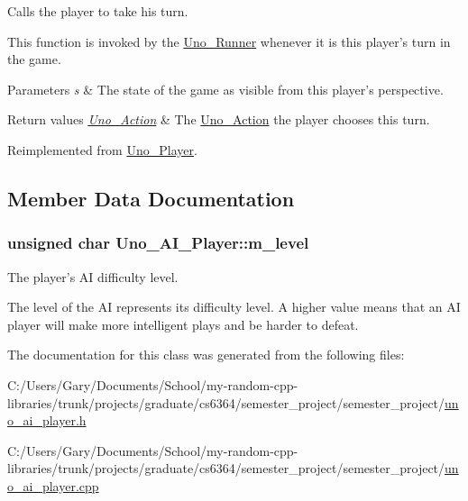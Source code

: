 \-Calls the player to take his turn. 

\-This function is invoked by the \hyperlink{class_uno___runner}{\-Uno\-\_\-\-Runner} whenever it is this player's turn in the game. 
\begin{DoxyParams}{\-Parameters}
{\em s} & \-The state of the game as visible from this player's perspective. \\
\hline
\end{DoxyParams}

\begin{DoxyRetVals}{\-Return values}
{\em \hyperlink{class_uno___action}{\-Uno\-\_\-\-Action}} & \-The \hyperlink{class_uno___action}{\-Uno\-\_\-\-Action} the player chooses this turn. \\
\hline
\end{DoxyRetVals}


\-Reimplemented from \hyperlink{class_uno___player_aa6e4a3177c39ee2572250b2dd4400a43}{\-Uno\-\_\-\-Player}.



\subsection{\-Member \-Data \-Documentation}
\hypertarget{class_uno___a_i___player_a028b0df8cca96eb10fc87bebf0f48c25}{
\subsubsection[{m\-\_\-level}]{\setlength{\rightskip}{0pt plus 5cm}unsigned char {\bf \-Uno\-\_\-\-A\-I\-\_\-\-Player\-::m\-\_\-level}}}
\label{class_uno___a_i___player_a028b0df8cca96eb10fc87bebf0f48c25}


\-The player's \-A\-I difficulty level. 

\-The level of the \-A\-I represents its difficulty level. \-A higher value means that an \-A\-I player will make more intelligent plays and be harder to defeat. 

\-The documentation for this class was generated from the following files\-:\begin{DoxyCompactItemize}
\item 
\-C\-:/\-Users/\-Gary/\-Documents/\-School/my-\/random-\/cpp-\/libraries/trunk/projects/graduate/cs6364/semester\-\_\-project/semester\-\_\-project/\hyperlink{uno__ai__player_8h}{uno\-\_\-ai\-\_\-player.\-h}\item 
\-C\-:/\-Users/\-Gary/\-Documents/\-School/my-\/random-\/cpp-\/libraries/trunk/projects/graduate/cs6364/semester\-\_\-project/semester\-\_\-project/\hyperlink{uno__ai__player_8cpp}{uno\-\_\-ai\-\_\-player.\-cpp}\end{DoxyCompactItemize}

